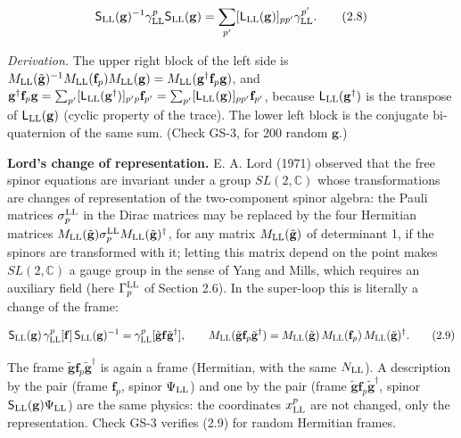\documentclass[
  10pt,
]{article}
\begin{document}
\[\mathsf S_{\rm LL}(\mathbf g)^{-1}\gamma^p_{\rm LL}\mathsf S_{\rm LL}(\mathbf g)=\sum_{p'}[\mathsf L_{\rm LL}(\mathbf g)]_{pp'}\gamma^{p'}_{\rm LL}.\tag{2.8}\]

\emph{Derivation.} The upper right block of the left side is
\(M_{\rm LL}(\tilde{\mathbf g})^{-1}M_{\rm LL}(\mathbf f_p)M_{\rm LL}(\mathbf g)=M_{\rm LL}(\mathbf g^\dagger\mathbf f_p\mathbf g)\),
and
\(\mathbf g^\dagger\mathbf f_p\mathbf g=\sum_{p'}[\mathsf L_{\rm LL}(\mathbf g^\dagger)]_{p'p}\mathbf f_{p'}=\sum_{p'}[\mathsf L_{\rm LL}(\mathbf g)]_{pp'}\mathbf f_{p'}\),
because \(\mathsf L_{\rm LL}(\mathbf g^\dagger)\) is the transpose of
\(\mathsf L_{\rm LL}(\mathbf g)\) (cyclic property of the trace). The
lower left block is the conjugate bi-quaternion of the same sum. (Check
GS-3, for 200 random \(\mathbf g\).)

\textbf{Lord's change of representation.} E. A. Lord (1971) observed
that the free spinor equations are invariant under a group
\(SL(2,\mathbb C)\) whose transformations are changes of representation
of the two-component spinor algebra: the Pauli matrices
\(\sigma^{\rm LL}_p\) in the Dirac matrices may be replaced by the four
Hermitian matrices
\(M_{\rm LL}(\tilde{\mathbf g})\sigma^{\rm LL}_pM_{\rm LL}(\tilde{\mathbf g})^\dagger\),
for any matrix \(M_{\rm LL}(\tilde{\mathbf g})\) of determinant 1, if
the spinors are transformed with it; letting this matrix depend on the
point makes \(SL(2,\mathbb C)\) a gauge group in the sense of Yang and
Mills, which requires an auxiliary field (here \(\Gamma^{\rm LL}_p\) of
Section 2.6). In the super-loop this is literally a change of the frame:

\[\mathsf S_{\rm LL}(\mathbf g)\,\gamma^p_{\rm LL}[\mathbf f]\,\mathsf S_{\rm LL}(\mathbf g)^{-1}=\gamma^p_{\rm LL}[\tilde{\mathbf g}\mathbf f\tilde{\mathbf g}^\dagger],\qquad M_{\rm LL}(\tilde{\mathbf g}\mathbf f_p\tilde{\mathbf g}^\dagger)=M_{\rm LL}(\tilde{\mathbf g})\,M_{\rm LL}(\mathbf f_p)\,M_{\rm LL}(\tilde{\mathbf g})^\dagger.\tag{2.9}\]

The frame \(\tilde{\mathbf g}\mathbf f_p\tilde{\mathbf g}^\dagger\) is
again a frame (Hermitian, with the same \(N_{\rm LL}\)). A description
by the pair (frame \(\mathbf f_p\), spinor \(\Psi_{\rm LL}\)) and one by
the pair (frame
\(\tilde{\mathbf g}\mathbf f_p\tilde{\mathbf g}^\dagger\), spinor
\(\mathsf S_{\rm LL}(\mathbf g)\Psi_{\rm LL}\)) are the same physics:
the coordinates \(x^p_{\rm LL}\) are not changed, only the
representation. Check GS-3 verifies (2.9) for random Hermitian frames.
\end{document}
